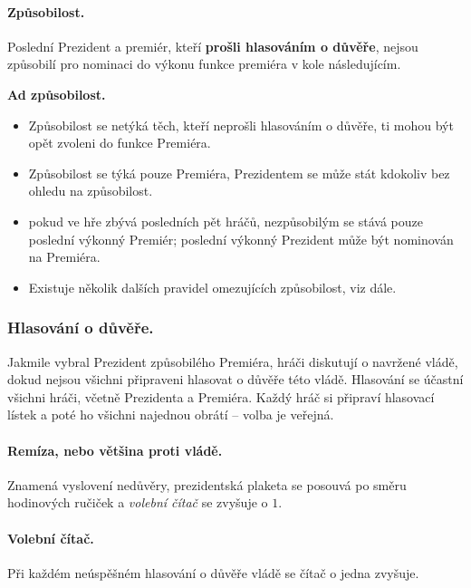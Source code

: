 \documentclass{article}
\newenvironment{redbox}{
    \vspace{1em}
    \color{red}\it
}
{
    \normalsize
    \vspace{1em}
}
\begin{document}
            \paragraph{Způsobilost.} Poslední Prezident a premiér, kteří {\bf prošli hlasováním o důvěře}, nejsou způsobilí pro nominaci do výkonu funkce premiéra v kole následujícím.

            \begin{redbox}
                {\bf\noindent Ad způsobilost.}
                \begin{itemize}
                    \item Způsobilost se netýká těch, kteří neprošli hlasováním o důvěře, ti mohou být opět zvoleni do funkce Premiéra.
                    \item Způsobilost se týká pouze Premiéra, Prezidentem se může stát kdokoliv bez ohledu na způsobilost.
                    \item pokud ve hře zbývá posledních pět hráčů, nezpůsobilým se stává pouze poslední výkonný Premiér; poslední výkonný Prezident může být nominován na Premiéra.
                    \item Existuje několik dalších pravidel omezujících způsobilost, viz dále.
                \end{itemize}
            \end{redbox}

        \subsubsection{Hlasování o důvěře.}

            Jakmile vybral Prezident způsobilého Premiéra, hráči diskutují o navržené vládě, dokud nejsou všichni připraveni hlasovat o důvěře této vládě. Hlasování se účastní všichni hráči, včetně Prezidenta a Premiéra. Každý hráč si připraví hlasovací lístek a poté ho všichni najednou obrátí -- volba je veřejná.

            \paragraph{Remíza, nebo většina proti vládě.} Znamená vyslovení nedůvěry, prezidentská plaketa se posouvá po směru hodinových ručiček a {\em volební čítač} se zvyšuje o $1$.

            \paragraph{Volební čítač.} Při každém neúspěšném hlasování o důvěře vládě se čítač o jedna zvyšuje.
\end{document}
